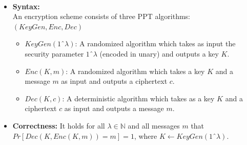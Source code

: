 	\begin{definition}\ 
    	\begin{itemize}
        	\item \textbf{Syntax:}\\
        	An encryption scheme consists of three PPT algorithms: $(KeyGen,Enc,Dec)$
            	\begin{itemize}
                	\item $KeyGen(1ˆ{\lambda})$: A randomized algorithm which takes as input the security parameter $1ˆ{\lambda}$ (encoded in unary) and outputs a key $K$.
                	\item $Enc(K,m)$: A randomized algorithm which takes a key $K$ and a message $m$ as input and outputs a ciphertext $c$.
                	\item $Dec(K,c)$: A deterministic algorithm which takes as a key $K$ and a ciphertext $c$ as input and outputs a message $m$.
            	\end{itemize}
        	\item \textbf{Correctness:}\newline
            It holds for all $\lambda \in \mathbb{N}$ and all messages $m$ that $Pr[Dec(K,Enc(K,m))=m]=1$, where $K \leftarrow KeyGen(1ˆ{\lambda})$.\newline
    	\end{itemize}
	\end{definition}


